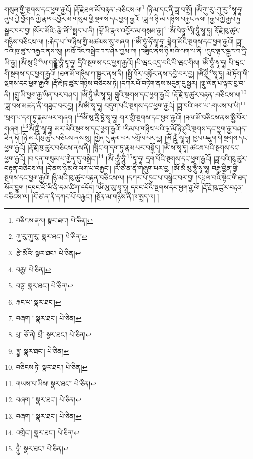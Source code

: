 གསུམ་གྱི་སྔགས་དང་ཕྱག་རྒྱའོ། །རྡོ་རྗེ་ཐལ་མོ་བརྟན་:བཅིངས་ལ།\footnote{བཅིངས་ནས།  སྣར་ཐང་།  པེ་ཅིན། } །ཉི་མ་དང་ནི་ཟླ་བ་སྤྲོ། །ཨོཾ་ཀུ་རུ་:ཀུ་རུ་\footnote{ཀུ་རུ་ཀུ་རུ་  སྣར་ཐང་།  པེ་ཅིན། }སྭཱ་ཧཱ། ནུབ་ཀྱི་ཕྱོགས་ཀྱི་རྣལ་འབྱོར་མ་གསུམ་གྱི་སྔགས་དང་ཕྱག་རྒྱའོ། །ཟླ་བ་ཉི་མ་གཉིས་བརྐྱང་ནས། །རྒྱབ་ཀྱི་རྒྱབ་ཏུ་སྦྱར་བར་བྱ། །སོར་མོའི་:རྩེ་མོ་\footnote{རྩེ་མོའི་  སྣར་ཐང་།  པེ་ཅིན། }སྤྲད་པ་ནི། །ལྷོ་ཡི་རྣལ་འབྱོར་མ་གསུམ་རྒྱ།\footnote{བརྒྱ།  པེ་ཅིན། } །ཨོཾ་བེཏྟཱ་\footnote{བཏྟ་  སྣར་ཐང་།  པེ་ཅིན། }ལཱི་ཧཱུྃ་སྭཱ་ཧཱ། རྡོ་རྗེ་ཁུ་ཚུར་གཉིས་བཅིངས་ལ། །:རྐེད་པ་\footnote{རྐང་པ་  སྣར་ཐང་། }གཉིས་ཀྱི་མཚམས་སུ་གཞག །\footnote{བཞག །  སྣར་ཐང་།  པེ་ཅིན། }ཨོཾ་ཧཱུཾ་ཧོ་སྭཱ་ཧཱ། སྒེག་མོའི་སྔགས་དང་ཕྱག་རྒྱའོ། །ཟླ་བའི་ཁུ་ཚུར་བརྒྱང་ནས་སུ། །མཐོ་བོང་བསྒྲེང་བར་ཤེས་བྱས་ལ། །བཟུང་ནས་ཉི་མའི་ལག་པ་ནི། །དུང་ལྟར་སྦྱར་བ་དྲི་ཡི་རྒྱ། །ཨོཾ་སུ་པྲི་\footnote{པྲ་  ཅོ་ནེ། པྲྀ་  སྣར་ཐང་།  པེ་ཅིན། }ཡ་གནྡྷེ་ཧཱུྃ་སྭཱ་ཧཱ། དྲིའི་སྔགས་དང་ཕྱག་རྒྱའོ། །པི་ཝང་འདྲ་བའི་པི་ཝང་གིས། །ཨོཾ་ཧཱུྃ་སྭཱ་ཧཱ། པི་ཝང་གི་སྔགས་དང་ཕྱག་རྒྱའོ། །ཐལ་མོ་གཉིས་ཀ་སྦྱར་ནས་ནི། །སྤྱི་བོར་བསྐོར་ནས་དབྱེ་བར་བྱ། །ཨོཾ་ཤྲཱིཾ་\footnote{ཏྠཱ་  སྣར་ཐང་།  པེ་ཅིན། }སྭཱ་ཧཱ། མེ་ཏོག་གི་སྔགས་དང་ཕྱག་རྒྱའོ། །རྡོ་རྗེ་ཁུ་ཚུར་གཉིས་བཅིངས་ཏེ། །དཀར་པོ་བཏེག་ནས་མདུན་དུ་སྦྱར། །གླུ་ལེན་པ་ལྟར་བྱ་བ་ནི། །གླུ་ཡི་ཕྱག་རྒྱ་ཡིན་པར་བཤད། །ཨོཾ་ཧཱུྃ་ཨྃ་སྭཱ་ཧཱ། གླུའི་སྔགས་དང་ཕྱག་རྒྱའོ། །རྡོ་རྗེ་ཁུ་ཚུར་བརྟན་:བཅིངས་ལ།\footnote{བཅིངས་ཏེ།  སྣར་ཐང་།  པེ་ཅིན། } །ཟླ་བས་མཚན་ནི་གཟུང་བར་བྱ། །ཨོཾ་ཨི་སྭཱ་ཧཱ། བདུག་པའི་སྔགས་དང་ཕྱག་རྒྱའོ། །ཟླ་བའི་ལག་པ་:གཡས་པ་ཡི།\footnote{གཡས་པ་ཡིས།  སྣར་ཐང་།  པེ་ཅིན། } །ཕྲག་པ་དག་ཏུ་རྣམ་པར་གཞག །\footnote{བཞག །  སྣར་ཐང་།  པེ་ཅིན། }ཨོཾ་སུ་ནྲི་ཏྱེ་སྭཱ་ཧཱ། གར་གྱི་སྔགས་དང་ཕྱག་རྒྱའོ། །ཐལ་མོ་བཅིངས་ནས་སྤྱི་བོར་གཞག །\footnote{བཞག །  སྣར་ཐང་།  པེ་ཅིན། }ཨོཾ་ཀྵུྃ་སྭཱ་ཧཱ། མར་མེའི་སྔགས་དང་ཕྱག་རྒྱའོ། །རིམ་པ་གཉིས་པའི་ལྷ་མོ་ཉི་ཤུའི་སྔགས་དང་ཕྱག་རྒྱ་བཤད་ཟིན་ཏོ། །ཉི་མའི་ཁུ་ཚུར་བཅིངས་ནས་སུ། །གྱེན་དུ་རྣམ་པར་དགྲོལ་བར་བྱ། །ཨོཾ་ཀྵུྃ་སྭཱ་ཧཱ། ཁྱབ་འཇུག་གི་སྔགས་དང་ཕྱག་རྒྱའོ། །རྡོ་རྗེ་ཁུ་ཚུར་བཅིངས་ནས་ནི། །སྙིང་ག་དག་ཏུ་རྣམ་པར་བསྐྱོད། །ཨོཾ་ས་སྭཱ་ཧཱ། ཚངས་པའི་སྔགས་དང་ཕྱག་རྒྱའོ། །བ་དན་གསུམ་པ་གྱེན་དུ་བསྒྲེང་།\footnote{འགྲེང་།  སྣར་ཐང་།  པེ་ཅིན། } །ཨོཾ་:ཧཱུྃ་ཧཱུྃ་\footnote{ཧཱུྃ་  སྣར་ཐང་།  པེ་ཅིན། }སྭཱ་ཧཱ། དྲག་པོའི་སྔགས་དང་ཕྱག་རྒྱའོ། །ཟླ་བའི་ཁུ་ཚུར་བརྟན་བཅིངས་ལ། །དེ་ནས་ཉི་མའི་ལག་པ་བརྐྱང་། །རོ་ཙ་ན་ནི་གཞུག་པར་བྱ། །ཨོཾ་མྃ་མུ་ཧཱུྃ་སྭཱ་ཧཱ། བརྒྱ་བྱིན་གྱི་སྔགས་དང་ཕྱག་རྒྱའོ། །ཉི་མའི་ཁུ་ཚུར་བརྟན་བཅིངས་ལ། །དཀར་པོ་དུང་པ་བསྒྲེང་བར་བྱ། །དཔྲལ་བའི་སྟེང་གི་ཐད་སོར་བྱུག །དབང་པོ་ཡི་ནི་དམ་ཚིག་འདོད། །ཨོཾ་མུ་མུ་སྭཱ་ཧཱ། དབང་པོའི་སྔགས་དང་ཕྱག་རྒྱའོ། །རྡོ་རྗེ་ཁུ་ཚུར་བརྟན་བཅིངས་ལ། །རོ་ཙ་ན་ནི་དཀར་པོ་བརྐྱང་། །སྔོན་མ་གཉིས་ནི་ཁ་སྤྲད་ལ། །
